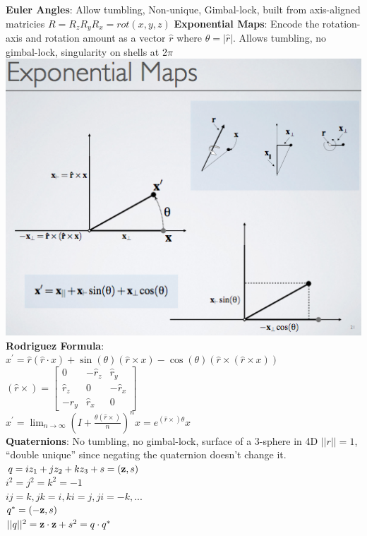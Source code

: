 \documentclass[3pt,landscape]{article}
\begin{document}
\begin{multicols}{3}
{\bf Euler Angles}: Allow tumbling, Non-unique, Gimbal-lock, built from axis-aligned matricies \(R=R_zR_yR_x=rot(x,y,z)\)
{\bf Exponential Maps}: Encode the rotation-axis and rotation amount as a vector \(\hat{r}\) where \(\theta = |\hat{r}|\). Allows tumbling, no gimbal-lock, singularity on shells at 2\(\pi\)\\
\includegraphics[scale=0.5]{images/exponential_map}\\
{\bf Rodriguez Formula}: \(x^{'}=\hat{r}(\hat{r}\cdot x)+\sin(\theta)(\hat{r}\times x)-\cos(\theta)(\hat{r}\times (\hat{r}\times x))\)\\
\((\hat{r}\times)=
\begin{bmatrix}
0 & -\hat{r}_z & \hat{r}_y \\
\hat{r}_z & 0 & -\hat{r}_x \\
-\hat{r}_y & \hat{r}_x & 0
\end{bmatrix}
\)\\
\(x^{'}=\lim_{n \to \infty}(I+\frac{\theta(\hat{r}\times)}{n})^n x = e^{(\hat{r}\times)\theta}x\)\\
{\bf Quaternions}: No tumbling, no gimbal-lock, surface of a 3-sphere in 4D \(||r||=1\), ``double unique'' since negating the quaternion doesn't change it.\\
\(q=iz_1+jz_2+kz_3+s=({\bf z},s)\)\\
\(i^2=j^2=k^2=-1\)\\
\(ij=k, jk=i, ki=j, ji=-k, ...\)\\
\(q^{*}=({\bf -z},s)\)\\
\(||q||^2={{\bf z}\cdot {\bf z}}+s^2=q\cdot q^{*}\)\\

\end{multicols}
\end{document}
